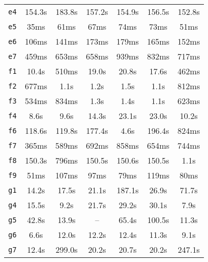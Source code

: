 \begin{tabular}{lcccccc}
\texttt{e4} & 154.3s & 183.8s & 157.2s & 154.9s & 156.5s & 152.8s \\
\texttt{e5} & 35ms & 61ms & 67ms & 74ms & 73ms & 51ms \\
\texttt{e6} & 106ms & 141ms & 173ms & 179ms & 165ms & 152ms \\
\texttt{e7} & 459ms & 653ms & 658ms & 939ms & 832ms & 717ms \\
\texttt{f1} & 10.4s & 510ms & 19.0s & 20.8s & 17.6s & 462ms \\
\texttt{f2} & 677ms & 1.1s & 1.2s & 1.5s & 1.1s & 812ms \\
\texttt{f3} & 534ms & 834ms & 1.3s & 1.4s & 1.1s & 623ms \\
\texttt{f4} & 8.6s & 9.6s & 14.3s & 23.1s & 23.0s & 10.2s \\
\texttt{f6} & 118.6s & 119.8s & 177.4s & 4.6s & 196.4s & 824ms \\
\texttt{f7} & 365ms & 589ms & 692ms & 858ms & 654ms & 744ms \\
\texttt{f8} & 150.3s & 796ms & 150.5s & 150.6s & 150.5s & 1.1s \\
\texttt{f9} & 51ms & 107ms & 97ms & 79ms & 119ms & 80ms \\
\texttt{g1} & 14.2s & 17.5s & 21.1s & 187.1s & 26.9s & 71.7s \\
\texttt{g4} & 15.5s & 9.2s & 21.7s & 29.2s & 30.1s & 7.9s \\
\texttt{g5} & 42.8s & 13.9s & -- & 65.4s & 100.5s & 11.3s \\
\texttt{g6} & 6.6s & 12.0s & 12.2s & 12.4s & 11.3s & 9.1s \\
\texttt{g7} & 12.4s & 299.0s & 20.2s & 20.7s & 20.2s & 247.1s \\
\bottomrule
\end{tabular}

